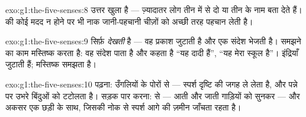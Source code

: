 \begin{solution}{exo:g1:the-five-senses:8}
उत्तर खुला है --- ज़्यादातर लोग तीन में से दो या तीन के नाम बता देते
हैं।  की कोई मदद न होने पर भी नाक जानी-पहचानी चीज़ों को अच्छी तरह
पहचान लेती है।
\end{solution}

\begin{solution}{exo:g1:the-five-senses:9}
 सिर्फ़ \emph{देखती} है --- वह प्रकाश जुटाती है और एक संदेश भेजती
है। समझने का काम मस्तिष्क करता है: वह संदेश पाता है और कहता है ``यह
दादी हैं'', ``यह मेरा स्कूल है''। इंद्रियाँ जुटाती हैं; मस्तिष्क
समझता है।
\end{solution}

\begin{solution}{exo:g1:the-five-senses:10}
पढ़ना: उँगलियों के पोरों से --- स्पर्श दृष्टि की जगह ले लेता है, और
पन्ने पर उभरे बिंदुओं को टटोलता है। सड़क पार करना:  से --- आती
और जाती गाड़ियों को सुनकर --- और अकसर एक छड़ी के साथ, जिसकी नोक से
स्पर्श आगे की ज़मीन जाँचता रहता है।
\end{solution}
